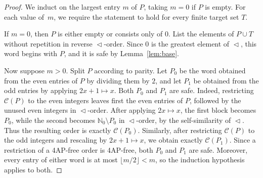\documentclass[12pt,reqno]{amsart}
\newcommand{\NN}{\mathbb N}
\newcommand{\bits}{\mathrel{\triangleleft}}
\newcommand{\C}[1]{\mathcal C(#1)}
\begin{document}
\begin{proof}
We induct on the largest entry $m$ of $P$, taking $m=0$ if $P$ is empty. For
each value of~$m$, we require the statement to hold for every finite target set
$T$.

If $m=0$, then $P$ is either empty or consists only of $0$. List the elements of
$P\cup T$ without repetition in reverse $\bits$-order. Since $0$ is the
greatest element of $\bits$, this word begins with $P$, and it is safe by
Lemma~\ref{lem:base}.

Now suppose $m>0$. Split $P$ according to parity. Let $P_0$ be the word obtained
from the even entries of $P$ by dividing them by $2$, and let $P_1$ be obtained
from the odd entries by applying $2x+1\mapsto x$. Both $P_0$ and $P_1$ are safe.
Indeed, restricting $\C P$ to the even integers leaves first the even entries
of $P$, followed by the unused even integers in $\bits$-order. After applying
$2x\mapsto x$, the first block becomes $P_0$, while the second becomes
$\NN_0\setminus P_0$ in $\bits$-order, by the self-similarity of $\bits$.
Thus the resulting order is exactly $\C{P_0}$.
Similarly, after restricting $\C P$ to the odd integers and rescaling by
$2x+1\mapsto x$, we obtain exactly $\C{P_1}$. Since a restriction of a 4AP-free
order is 4AP-free, both $P_0$ and $P_1$ are safe. Moreover, every entry of
either word is at most $\lfloor m/2\rfloor<m$, so the induction hypothesis
applies to both.


\end{proof}
\end{document}

